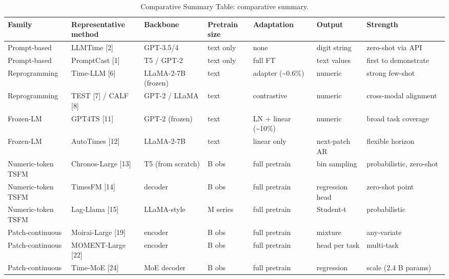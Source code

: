 \documentclass{article}
\begin{document}
\begin{table}[t]
\centering
\caption{Comparative Summary Table: comparative summary.}
\label{tab:comparative-summary-table}
\begin{tabular}{>{\raggedright\arraybackslash}p{0.1406\linewidth}
  >{\raggedright\arraybackslash}p{0.1641\linewidth}
  >{\raggedright\arraybackslash}p{0.1484\linewidth}
  >{\raggedright\arraybackslash}p{0.1016\linewidth}
  >{\raggedright\arraybackslash}p{0.1406\linewidth}
  >{\raggedright\arraybackslash}p{0.1172\linewidth}
  >{\raggedright\arraybackslash}p{0.1875\linewidth}}
\toprule
Family & Representative method & Backbone & Pretrain size & Adaptation & Output & Strength \\
\midrule
Prompt-based & LLMTime {[}2{]} & GPT-3.5/4 & text only & none & digit string & zero-shot via API \\
Prompt-based & PromptCast {[}1{]} & T5 / GPT-2 & text only & full FT & text values & first to demonstrate \\
Reprogramming & Time-LLM {[}6{]} & LLaMA-2-7B (frozen) & text & adapter (\textasciitilde0.6\%) & numeric & strong few-shot \\
Reprogramming & TEST {[}7{]} / CALF {[}8{]} & GPT-2 / LLaMA & text & contrastive & numeric & cross-modal alignment \\
Frozen-LM & GPT4TS {[}11{]} & GPT-2 (frozen) & text & LN + linear (\textasciitilde10\%) & numeric & broad task coverage \\
Frozen-LM & AutoTimes {[}12{]} & LLaMA-2-7B & text & linear only & next-patch AR & flexible horizon \\
Numeric-token TSFM & Chronos-Large {[}13{]} & T5 (from scratch) & 84 B obs & full pretrain & bin sampling & probabilistic, zero-shot \\
Numeric-token TSFM & TimesFM {[}14{]} & decoder & 100 B obs & full pretrain & regression head & zero-shot point \\
Numeric-token TSFM & Lag-Llama {[}15{]} & LLaMA-style & 8.4 M series & full pretrain & Student-t & probabilistic \\
Patch-continuous & Moirai-Large {[}19{]} & encoder & 27.7 B obs & full pretrain & mixture & any-variate \\
Patch-continuous & MOMENT-Large {[}22{]} & encoder & 13 B obs & full pretrain & head per task & multi-task \\
Patch-continuous & Time-MoE {[}24{]} & MoE decoder & 300 B obs & full pretrain & regression & scale (2.4 B params) \\
\end{tabular}
\end{table}
\end{document}
